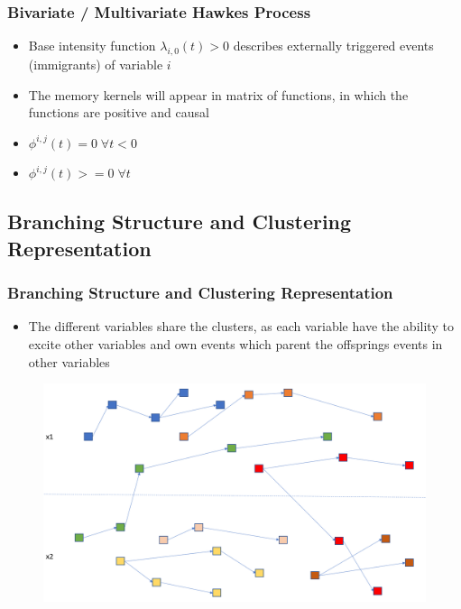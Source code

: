 \documentclass{beamer}
\begin{document}
\begin{frame}
\frametitle{Bivariate / Multivariate Hawkes Process}
\begin{itemize}
	\item Base intensity function $\lambda_{i,0}(t)>0$ describes externally triggered events (immigrants) of variable $i$
	\item The memory kernels will appear in matrix of functions, in which the functions are positive and causal
	\item $\phi^{i,j}(t) = 0 \; \forall t < 0$
	\item $\phi^{i,j}(t) >= 0 \; \forall t$
\end{itemize}
\end{frame}

\subsection{Branching Structure and Clustering Representation}
\begin{frame}
\frametitle{Branching Structure and Clustering Representation}
\begin{itemize}
	\item The different variables share the clusters, as each variable have the ability to excite other variables and own events which parent the offsprings events in other variables
\end{itemize}
\begin{figure}[h]
      \centering
	\includegraphics[scale=0.3]{image/Bivariate_Branching_Structure.png}
\end{figure}
\end{frame}
\end{document}
